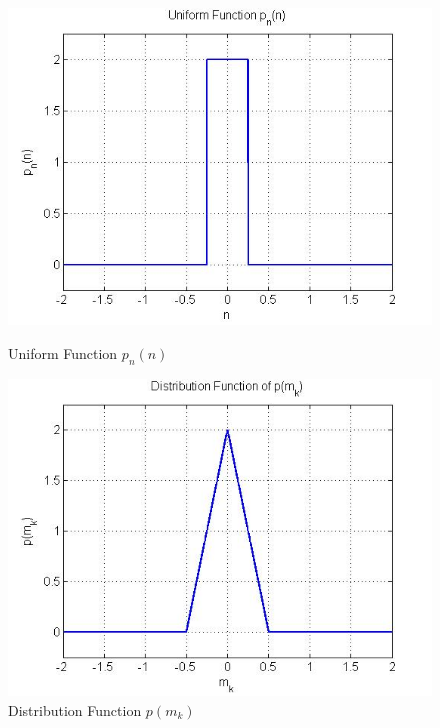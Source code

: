 \documentclass{article}
\begin{document}
\begin{figure}
\begin{center}
\includegraphics[width=1.0\textwidth]{HW2-1.jpg}
\caption{Uniform Function $ p_n(n) $}
\includegraphics[width=1.0\textwidth]{HW2-2.jpg}
\caption{Distribution Function $ p(m_k) $}
\end{center}
\end{figure}
\end{document}
